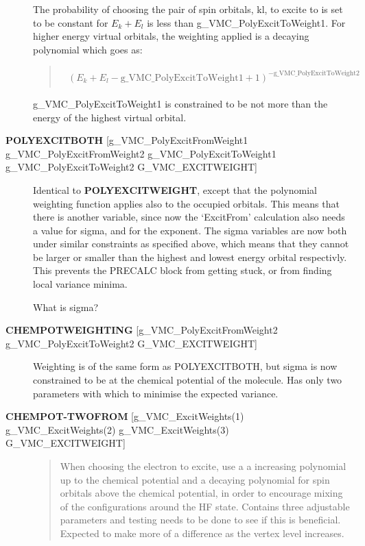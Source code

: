 \documentclass[openany,a4paper,10pt]{manual}
\begin{document}
\begin{description}
The probability of choosing the pair of spin orbitals, kl, to excite
to is set to be constant for $E_k+E_l$ is less than
g\_VMC\_PolyExcitToWeight1.  For higher energy virtual orbitals,
the weighting applied is a decaying polynomial which goes as:
\begin{quote}
\begin{align}\begin{split}(E_k+E_l-\text{g\_VMC\_PolyExcitToWeight1}+1)^{-\text{g\_VMC\_PolyExcitToWeight2}}\end{split}\end{align}\end{quote}

g\_VMC\_PolyExcitToWeight1 is constrained to be not more than the
energy of the highest virtual orbital.

\item[\textbf{POLYEXCITBOTH} {[}g\_VMC\_PolyExcitFromWeight1 g\_VMC\_PolyExcitFromWeight2 g\_VMC\_PolyExcitToWeight1 g\_VMC\_PolyExcitToWeight2 G\_VMC\_EXCITWEIGHT{]}]
Identical to \textbf{POLYEXCITWEIGHT}, except that the polynomial weighting
function applies also to the occupied orbitals.  This means that there
is another variable, since now the `ExcitFrom' calculation also needs
a value for sigma, and for the exponent.  The sigma variables are
now both under similar constraints as specified above, which means
that they cannot be larger or smaller than the highest and lowest
energy orbital respectivly.  This prevents the PRECALC block from
getting stuck, or from finding local variance minima.

\begin{notice}[note]
What is sigma?
\end{notice}

\item[\textbf{CHEMPOTWEIGHTING} {[}g\_VMC\_PolyExcitFromWeight2 g\_VMC\_PolyExcitToWeight2 G\_VMC\_EXCITWEIGHT{]}]
Weighting is of the same form as POLYEXCITBOTH, but sigma is
now constrained to be at the chemical potential of the molecule.
Has only two parameters with which to minimise the expected variance.

\item[\textbf{CHEMPOT-TWOFROM} {[}g\_VMC\_ExcitWeights(1) g\_VMC\_ExcitWeights(2) g\_VMC\_ExcitWeights(3) G\_VMC\_EXCITWEIGHT{]}]\begin{quote}

When choosing the electron to excite, use a a increasing polynomial
up to the chemical potential and a decaying polynomial for spin orbitals
above the chemical potential, in order to encourage mixing of
the configurations around the HF state. Contains three adjustable
parameters and testing needs to be done to see if this is
beneficial. Expected to make more of a difference as the vertex
level increases.
\end{quote}


\end{description}
\end{document}
